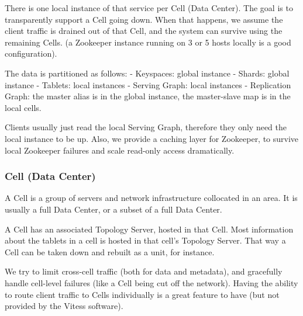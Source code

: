 \documentclass{scrartcl}
\begin{document}
There is one local instance of that service per Cell (Data Center). The goal is to transparently support a Cell going down. When that happens, we assume the client traffic is drained out of that Cell, and the system can survive
using the remaining Cells. (a Zookeeper instance running on 3 or 5 hosts locally is a good configuration).

The data is partitioned as follows:
- Keyspaces: global instance
- Shards: global instance
- Tablets: local instances
- Serving Graph: local instances
- Replication Graph: the master alias is in the global instance, the master-slave map is in the local cells.

Clients usually just read the local Serving Graph, therefore they only need the local instance to be up. Also, we provide a caching layer for Zookeeper, to survive local Zookeeper failures and scale read-only access dramatically.

\subsubsection{Cell (Data Center)}\hypertarget{cell-data-center}{}\label{cell-data-center}

A Cell is a group of servers and network infrastructure collocated in an area. It is usually a full Data Center, or a subset of a full Data Center.

A Cell has an associated Topology Server, hosted in that Cell. Most information about the tablets in a cell is hosted in that cell's Topology Server. That way a Cell can be taken down and rebuilt as a unit, for instance.

We try to limit cross-cell traffic (both for data and metadata), and gracefully handle cell-level failures (like a Cell being cut off the network). Having the ability to route client traffic to Cells individually is a great feature to have
(but not provided by the Vitess software).
\end{document}
